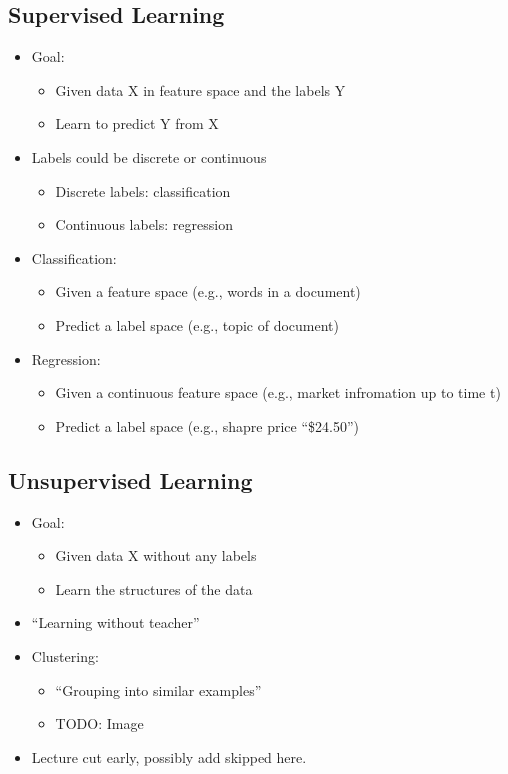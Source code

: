 \subsection{Supervised Learning}
\begin{itemize}
	\item Goal:
	\begin{itemize}
		\item Given data X in feature space and the labels Y
		\item Learn to predict Y from X
	\end{itemize}
	\item Labels could be discrete or continuous
	\begin{itemize}
		\item Discrete labels: classification
		\item Continuous labels: regression
	\end{itemize}
	\item Classification:
	\begin{itemize}
		\item Given a feature space (e.g., words in a document)
		\item Predict a label space (e.g., topic of document)
	\end{itemize}
	\item Regression: 
	\begin{itemize}
		\item Given a continuous feature space (e.g., market infromation up to time t)
		\item Predict a label space (e.g., shapre price ``\$24.50'')
	\end{itemize}
\end{itemize}

\subsection{Unsupervised Learning}
\begin{itemize}
	\item Goal:
	\begin{itemize}
		\item Given data X without any labels
		\item Learn the structures of the data
	\end{itemize}
	\item ``Learning without teacher''
	\item Clustering:
	\begin{itemize}
		\item ``Grouping into similar examples''
		\item TODO: Image
	\end{itemize}
	\item Lecture cut early, possibly add skipped here.
\end{itemize}
